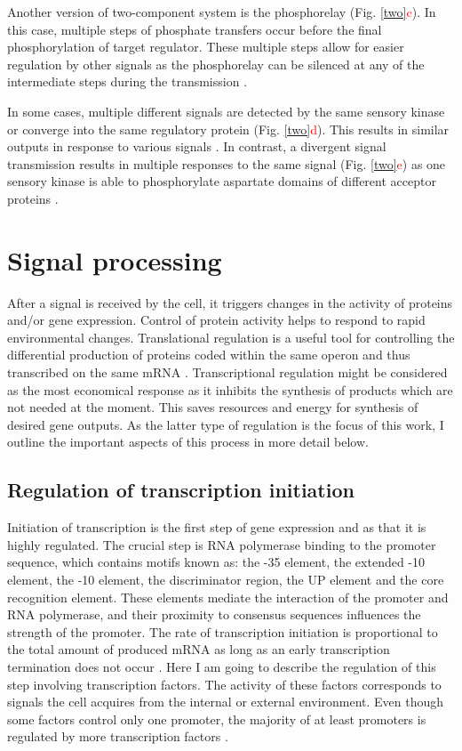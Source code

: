 Another version of two-component system is the phosphorelay (Fig. \ref{two}\textcolor{red}{c}).
In this case, multiple steps of phosphate transfers occur before the final phosphorylation of target regulator.
These multiple steps allow for easier regulation by other signals as the phosphorelay can be silenced at any of the intermediate steps during the transmission \cite{perego2001pentapeptide, groisman2016feedback}.

In some cases, multiple different signals are detected by the same sensory kinase or converge into the same regulatory protein (Fig. \ref{two}\textcolor{red}{d}).
This results in similar outputs in response to various signals \cite{kaczmarczyk2014complex, chambonnier2016hybrid}.
In contrast, a divergent signal transmission results in multiple responses to the same signal (Fig. \ref{two}\textcolor{red}{e}) as one sensory kinase is able to phosphorylate aspartate domains of different acceptor proteins \cite{mika2005two, groisman2016feedback}.

\section{Signal processing}
After a signal is received by the cell, it triggers changes in the activity of proteins and/or gene expression.
Control of protein activity helps to respond to rapid environmental changes. Translational regulation is a useful tool for controlling the differential production of proteins coded within the same operon and thus transcribed on the same mRNA \cite{dar2018extensive}.
Transcriptional regulation might be considered as the most economical response as it inhibits the synthesis of products which are not needed at the moment.
This saves resources and energy for synthesis of desired gene outputs.
As the latter type of regulation is the focus of this work, I outline the important aspects of this process in more detail below.

\subsection{Regulation of transcription initiation}
Initiation of transcription is the first step of gene expression and as that it is highly regulated.
The crucial step is RNA polymerase binding to the promoter sequence, which contains motifs known as: the -35 element, the extended -10 element, the -10 element, the
discriminator region, the UP element and the core recognition element.
These elements mediate the interaction of the promoter and RNA polymerase, and their proximity to consensus sequences influences the strength of the promoter.
The rate of transcription initiation is proportional to the total amount of produced mRNA as long as an early transcription termination does not occur \cite{kennell1977transcription, iyer1996absolute}.
Here I am going to describe the regulation of this step involving transcription factors.
The activity of these factors corresponds to signals the cell acquires from the internal or external environment.
Even though some factors control only one promoter, the majority of at least  promoters is regulated by more transcription factors \cite{karp2014ecocyc}.

